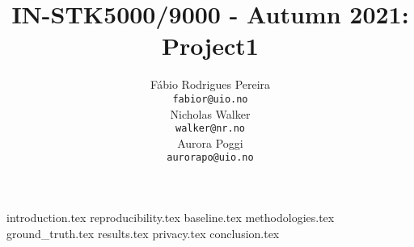 \documentclass[11pt,a4paper]{article}
\title{IN-STK5000/9000 - Autumn 2021: Project1}
\author{Fábio Rodrigues Pereira \\
  \texttt{fabior@uio.no} \\
  
  \And
  Nicholas Walker \\
  \texttt{walker@nr.no} \\
  
  \And
  Aurora Poggi \\
  \texttt{aurorapo@uio.no} \\}
\begin{document}
\maketitle

{introduction.tex}
{reproducibility.tex}
{baseline.tex}
{methodologies.tex}
{ground_truth.tex}
{results.tex}
{privacy.tex}
{conclusion.tex}



\end{document}
